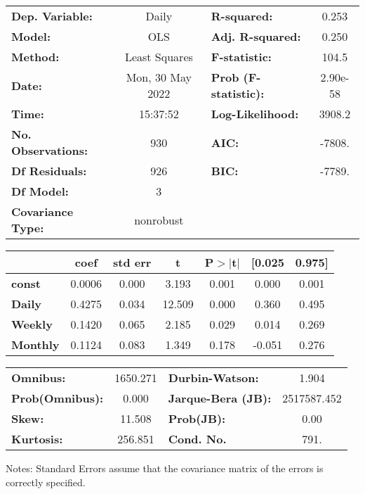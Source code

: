 \begin{center}
\begin{tabular}{lclc}
\toprule
\textbf{Dep. Variable:}    &      Daily       & \textbf{  R-squared:         } &      0.253   \\
\textbf{Model:}            &       OLS        & \textbf{  Adj. R-squared:    } &      0.250   \\
\textbf{Method:}           &  Least Squares   & \textbf{  F-statistic:       } &      104.5   \\
\textbf{Date:}             & Mon, 30 May 2022 & \textbf{  Prob (F-statistic):} &   2.90e-58   \\
\textbf{Time:}             &     15:37:52     & \textbf{  Log-Likelihood:    } &     3908.2   \\
\textbf{No. Observations:} &         930      & \textbf{  AIC:               } &     -7808.   \\
\textbf{Df Residuals:}     &         926      & \textbf{  BIC:               } &     -7789.   \\
\textbf{Df Model:}         &           3      & \textbf{                     } &              \\
\textbf{Covariance Type:}  &    nonrobust     & \textbf{                     } &              \\
\bottomrule
\end{tabular}
\begin{tabular}{lcccccc}
                 & \textbf{coef} & \textbf{std err} & \textbf{t} & \textbf{P$> |$t$|$} & \textbf{[0.025} & \textbf{0.975]}  \\
\midrule
\textbf{const}   &       0.0006  &        0.000     &     3.193  &         0.001        &        0.000    &        0.001     \\
\textbf{Daily}   &       0.4275  &        0.034     &    12.509  &         0.000        &        0.360    &        0.495     \\
\textbf{Weekly}  &       0.1420  &        0.065     &     2.185  &         0.029        &        0.014    &        0.269     \\
\textbf{Monthly} &       0.1124  &        0.083     &     1.349  &         0.178        &       -0.051    &        0.276     \\
\bottomrule
\end{tabular}
\begin{tabular}{lclc}
\textbf{Omnibus:}       & 1650.271 & \textbf{  Durbin-Watson:     } &      1.904   \\
\textbf{Prob(Omnibus):} &   0.000  & \textbf{  Jarque-Bera (JB):  } & 2517587.452  \\
\textbf{Skew:}          &  11.508  & \textbf{  Prob(JB):          } &       0.00   \\
\textbf{Kurtosis:}      & 256.851  & \textbf{  Cond. No.          } &       791.   \\
\bottomrule
\end{tabular}
\end{center}

Notes: \newline
 [1] Standard Errors assume that the covariance matrix of the errors is correctly specified.